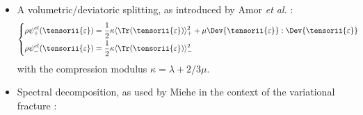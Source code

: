 \begin{itemize}
    \item A volumetric/deviatoric splitting, as introduced by Amor \textit{et al.}
    \cite{2009_AMOR_MARIGO_MAURINI_RegularizedFormulationOfTheVariationalBrittleFractureWithUnilateralContactNumericalExperiments}:
    \begin{equation}
        \begin{cases}
            \begin{aligned}
                & \rho \psi^{el}_{+}(\tensorii{\varepsilon})
                =
                \frac{1}{2} \kappa \langle \Tr(\tensorii{\varepsilon}) \rangle_{+}^{2}
                +
                \mu \Dev{\tensorii{\varepsilon}} : \Dev{\tensorii{\varepsilon}}
                \\
                & \rho \psi^{el}_{-}(\tensorii{\varepsilon})
                =
                \frac{1}{2} \kappa \langle \Tr(\tensorii{\varepsilon}) \rangle_{-}^{2}
            \end{aligned}
        \end{cases}
    \end{equation}
    with the compression modulus $\kappa = \lambda + 2/3 \mu$.

    \item Spectral decomposition, as used by Miehe in the context of the
    variational fracture \cite{2010_MIEHE_HOFACKER_WELSCHINGER_APhaseFieldModelForRateIndependentCrackPropagationRobustAlgorithmicImplementationBasedOnOperatorSplits}:


\end{itemize}
